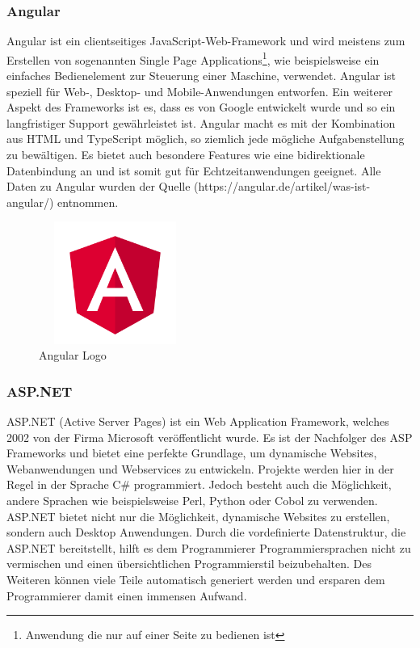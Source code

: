 \subsubsection{Angular}
Angular ist ein clientseitiges JavaScript-Web-Framework und wird meistens zum Erstellen von sogenannten Single Page Applications\footnote{Anwendung die nur auf einer Seite zu bedienen ist}, wie beispielsweise ein einfaches Bedienelement zur Steuerung einer Maschine, verwendet. Angular ist speziell für Web-, Desktop- und Mobile-Anwendungen entworfen. Ein weiterer Aspekt des Frameworks ist es, dass es von Google entwickelt wurde und so ein langfristiger Support gewährleistet ist. Angular macht es mit der Kombination aus HTML und TypeScript möglich, so ziemlich jede mögliche Aufgabenstellung zu bewältigen. Es bietet auch besondere Features wie eine bidirektionale Datenbindung an und ist somit gut für Echtzeitanwendungen geeignet. 
Alle Daten zu Angular wurden der Quelle (https://angular.de/artikel/was-ist-angular/) entnommen.
\begin{figure}[h]
	\centering
	\includegraphics[height=4cm,width=5cm]{images/Angular_Logo}
	\caption{Angular Logo}
	\label{fig:Angular Logo}
\end{figure}

\subsubsection{ASP.NET}
ASP.NET (Active Server Pages) ist ein Web Application Framework, welches 2002 von der Firma Microsoft veröffentlicht wurde. Es ist der Nachfolger des ASP Frameworks und bietet eine perfekte Grundlage, um dynamische Websites, Webanwendungen und Webservices zu entwickeln. Projekte werden hier in der Regel in der Sprache C\# programmiert. Jedoch besteht auch die Möglichkeit, andere Sprachen wie beispielsweise Perl, Python oder Cobol zu verwenden. ASP.NET bietet nicht nur die Möglichkeit, dynamische Websites zu erstellen, sondern auch Desktop Anwendungen.
Durch die vordefinierte Datenstruktur, die ASP.NET bereitstellt, hilft es dem Programmierer Programmiersprachen nicht zu vermischen und einen übersichtlichen Programmierstil beizubehalten. Des Weiteren können viele Teile automatisch generiert werden und ersparen dem Programmierer damit einen immensen Aufwand.

